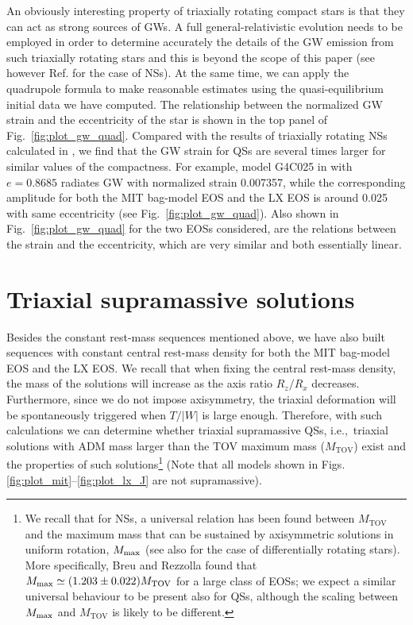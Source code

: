 \documentclass[twocolumn,superscriptaddress,showpacs,prd,aps,amsmath,amssymb,nofootinbib]{revtex4-1}
\newcommand{\ie}{i.e.,~}
\begin{document}
An obviously interesting property of triaxially rotating compact stars is
that they can act as strong sources of GWs. A full general-relativistic
evolution needs to be employed in order to determine accurately the
details of the GW emission from such triaxially rotating stars and this
is beyond the scope of this paper (see however Ref. \cite{Tsokaros2017}
for the case of NSs). At the same time, we can apply the quadrupole
formula to make reasonable estimates
using the quasi-equilibrium initial data we have computed. The
relationship between the normalized GW strain and the eccentricity of the
star is shown in the top panel of Fig.~\ref{fig:plot_gw_quad}. Compared
with the results of triaxially rotating NSs calculated in
\cite{Tsokaros2017}, we find that the GW strain for QSs are several times
larger for similar values of the compactness. For example, model G4C025
in \cite{Tsokaros2017} with $e=0.8685$ radiates GW with normalized strain
0.007357, while the corresponding amplitude for both the MIT bag-model
EOS and the LX EOS is around 0.025 with same eccentricity (see
Fig.~\ref{fig:plot_gw_quad}). Also shown in Fig.~\ref{fig:plot_gw_quad}
for the two EOSs considered, are the relations between the strain and the
eccentricity, which are very similar and both essentially linear.


\section{Triaxial supramassive solutions}
\label{sec:triasupraQS}

Besides the constant rest-mass sequences mentioned above, we have also
built sequences with constant central rest-mass density for both the MIT
bag-model EOS and the LX EOS. We recall that when fixing the central
rest-mass density, the mass of the solutions will increase as the axis
ratio $R_z/R_x$ decreases. Furthermore, since we do not impose
axisymmetry, the triaxial deformation will be spontaneously triggered
when $T/|W|$ is large enough. Therefore, with such calculations we can
determine whether triaxial supramassive QSs, \ie triaxial solutions with
ADM mass larger than the TOV maximum mass ($M_\mathrm{TOV}$) exist and
the properties of such solutions\footnote{We recall that for NSs, a
  universal relation has been found between $M_\mathrm{TOV}$ and the
  maximum mass that can be sustained by axisymmetric solutions in uniform
  rotation, $M_{\rm max}$ (see also \cite{Weih2017} for the case of
  differentially rotating stars). More specifically, Breu and Rezzolla
  \cite{Breu2016} found that $M_{\rm max} \simeq (1.203 \pm 0.022)
  M_\mathrm{TOV}$ for a large class of EOSs; we expect a similar
  universal behaviour to be present also for QSs,
  although the scaling between $M_{\rm max}$ and
  $M_\mathrm{TOV}$ is likely to be different.} (Note that all models
shown in Figs. \ref{fig:plot_mit}--\ref{fig:plot_lx_J} are not
supramassive).
\end{document}
